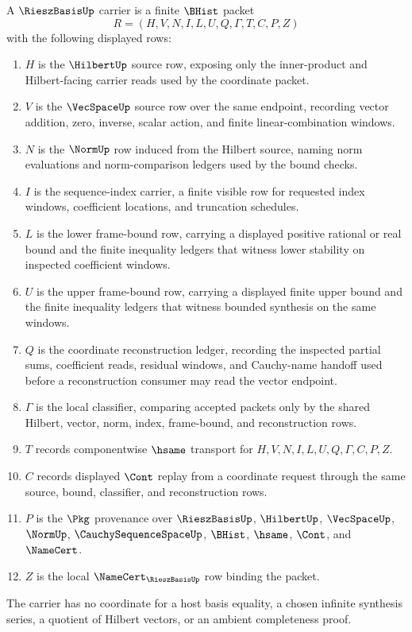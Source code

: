 \begin{definition}
\label{def:riesz-basis-carrier}
A $\RieszBasisUp$ carrier is a finite $\BHist$ packet
$$
R=(H,V,N,I,L,U,Q,\Gamma,T,C,P,Z)
$$
with the following displayed rows:
\begin{enumerate}
\item $H$ is the $\HilbertUp$ source row, exposing only the inner-product and Hilbert-facing carrier reads used by the coordinate packet.
\item $V$ is the $\VecSpaceUp$ source row over the same endpoint, recording vector addition, zero, inverse, scalar action, and finite linear-combination windows.
\item $N$ is the $\NormUp$ row induced from the Hilbert source, naming norm evaluations and norm-comparison ledgers used by the bound checks.
\item $I$ is the sequence-index carrier, a finite visible row for requested index windows, coefficient locations, and truncation schedules.
\item $L$ is the lower frame-bound row, carrying a displayed positive rational or real bound and the finite inequality ledgers that witness lower stability on inspected coefficient windows.
\item $U$ is the upper frame-bound row, carrying a displayed finite upper bound and the finite inequality ledgers that witness bounded synthesis on the same windows.
\item $Q$ is the coordinate reconstruction ledger, recording the inspected partial sums, coefficient reads, residual windows, and Cauchy-name handoff used before a reconstruction consumer may read the vector endpoint.
\item $\Gamma$ is the local classifier, comparing accepted packets only by the shared Hilbert, vector, norm, index, frame-bound, and reconstruction rows.
\item $T$ records componentwise $\hsame$ transport for $H,V,N,I,L,U,Q,\Gamma,C,P,Z$.
\item $C$ records displayed $\Cont$ replay from a coordinate request through the same source, bound, classifier, and reconstruction rows.
\item $P$ is the $\Pkg$ provenance over $\RieszBasisUp$, $\HilbertUp$, $\VecSpaceUp$, $\NormUp$, $\CauchySequenceSpaceUp$, $\BHist$, $\hsame$, $\Cont$, and $\NameCert$.
\item $Z$ is the local $\NameCert_{\RieszBasisUp}$ row binding the packet.
\end{enumerate}
The carrier has no coordinate for a host basis equality, a chosen infinite synthesis series, a quotient of Hilbert vectors, or an ambient completeness proof.
\end{definition}

